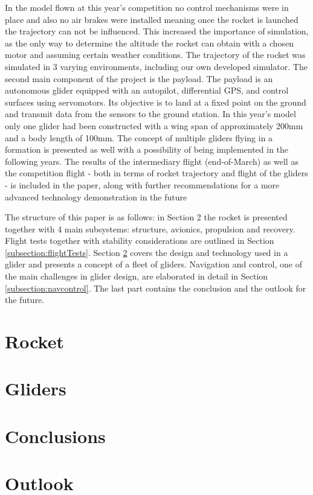 \documentclass[]{iac}
\begin{document}
In the model flown at this year's competition no control mechanisms were in place and also no air brakes were installed meaning once the rocket is launched the trajectory can not be influenced. This increased the importance of simulation, as the only way to determine the altitude the rocket can obtain with a chosen motor and assuming certain weather conditions.  The trajectory of the rocket was simulated in 3 varying environments, including our own developed simulator. 
The second main component of the project is the payload. The payload is an autonomous glider equipped with an autopilot, differential GPS, and control surfaces using servomotors. Its objective is to land at a fixed point on the ground and transmit data from the sensors to the ground station. In this year's model only one glider had been constructed with a wing span of approximately 200mm and a body length of 100mm. The concept of multiple gliders flying in a formation is presented as well with a possibility of being implemented in the following years.  
The results of the intermediary flight (end-of-March) as well as the competition flight - both in terms of rocket trajectory and flight of the gliders - is included in the paper, along with further recommendations for a more advanced technology demonstration in the future

The structure of this paper is as follows: in Section 2 the rocket is presented together with 4 main subsystems: structure, avionics, propulsion and recovery. Flight tests together with stability considerations are outlined in Section \ref{subsection:flightTests}.  Section \ref{section:gliders}  covers the design and technology used in a glider and presents a concept of a fleet of gliders. Navigation and control, one of the main challenges in glider design, are elaborated in detail in Section \ref{subsection:navcontrol}. The last part contains the conclusion and the outlook for the future. 


\section{Rocket}




\section{Gliders}
\label{section:gliders}




\section{Conclusions}
\section{Outlook}
\end{document}
